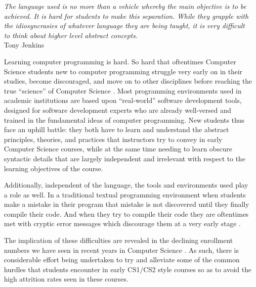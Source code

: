 \label{chapter:introduction}

\begin{flushright}
\textit{The language used is no more than a vehicle whereby the main objective is to be achieved. It is hard for students to make this separation. While they grapple with the idiosyncrasies of whatever language they are being taught, it is very difficult to think about higher level abstract concepts.}
\\
Tony Jenkins \cite{Jenkins02} \\
\end{flushright}

Learning computer programming is hard.  So hard that oftentimes Computer Science students new to computer programming struggle
very early on in their studies, become discouraged, and move on to other disciplines before reaching the true ``science'' of Computer Science \cite{Beaubouef05}.  Most programming environments used in academic institutions are based upon ``real-world'' software development tools, designed for software development experts who are already well-versed and trained in the fundamental ideas of computer programming.  New students thus face an uphill battle: they both have to learn and understand the abstract principles, theories, and practices that instructors try to convey in early Computer Science courses, while at the same time needing to learn obscure syntactic details that are largely independent and irrelevant with respect to the learning objectives of the course.

Additionally, independent of the language, the tools and environments used play a role as well.  In a traditional textual programming environment when students make a mistake in their program that mistake is not discovered until they finally compile their code.  And when they try to compile their code they are oftentimes met with cryptic error messages which discourage them at a very early stage \cite{Jenkins02,Hundhausen09,Kelleher05}.

The implication of these difficulties are revealed in the declining enrollment numbers we have seen in recent years in Computer Science \cite{Manaris07,Vesgo07,Ward08,Bayliss09}.  As such, there is considerable effort being undertaken to try and alleviate some of the common hurdles that students encounter in early CS1/CS2 style courses so as to avoid the high attrition rates seen in these courses.

